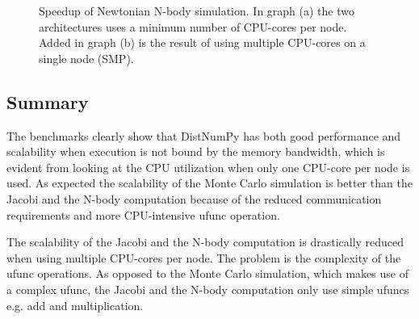 \documentclass[10pt]{article}
\begin{document}
\begin{figure}%
  \begin{center}%
    \caption{Speedup of Newtonian N-body simulation. In graph (a) the two architectures uses a minimum number of CPU-cores per node. Added in graph (b) is the result of using multiple CPU-cores on a single node (SMP).}%
    \label{fig:NbodyScale}%
  \end{center}
\end{figure}


\subsection{Summary}
The benchmarks clearly show that DistNumPy has both good performance and scalability when execution is not bound by the memory bandwidth, which is evident from looking at the CPU utilization when only one CPU-core per node is used. As expected the scalability of the Monte Carlo simulation is better than the Jacobi and the N-body computation because of the reduced communication requirements and more CPU-intensive ufunc operation. 

The scalability of the Jacobi and the N-body computation is drastically reduced when using multiple CPU-cores per node. The problem is the complexity of the ufunc operations. As opposed to the Monte Carlo simulation, which makes use of a complex ufunc, the Jacobi and the N-body computation only use simple ufuncs e.g. add and multiplication.
\end{document}
